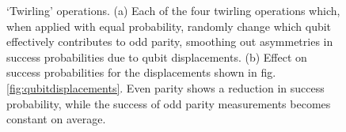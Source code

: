 \begin{figure}
	\centering
	\caption{`Twirling' operations. (a) Each of the four twirling operations which, when applied with equal probability, randomly change which qubit effectively contributes to odd parity, smoothing out asymmetries in success probabilities due to qubit displacements. (b) Effect on success probabilities for the displacements shown in fig.\@ \ref{fig:qubitdisplacements}. Even parity shows a reduction in success probability, while the success of odd parity measurements becomes constant on average.}
\end{figure}